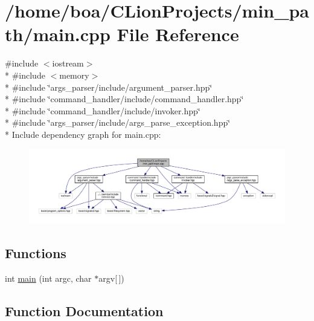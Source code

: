 \hypertarget{a00029}{}\section{/home/boa/\+C\+Lion\+Projects/min\+\_\+path/main.cpp File Reference}
\label{a00029}
{\ttfamily \#include $<$iostream$>$}\\*
{\ttfamily \#include $<$memory$>$}\\*
{\ttfamily \#include \char`\"{}args\+\_\+parser/include/argument\+\_\+parser.\+hpp\char`\"{}}\\*
{\ttfamily \#include \char`\"{}command\+\_\+handler/include/command\+\_\+handler.\+hpp\char`\"{}}\\*
{\ttfamily \#include \char`\"{}command\+\_\+handler/include/invoker.\+hpp\char`\"{}}\\*
{\ttfamily \#include \char`\"{}args\+\_\+parser/include/args\+\_\+parse\+\_\+exception.\+hpp\char`\"{}}\\*
Include dependency graph for main.\+cpp\+:
\nopagebreak
\begin{figure}[H]
\begin{center}
\leavevmode
\includegraphics[width=350pt]{d9/d73/a00060}
\end{center}
\end{figure}
\subsection*{Functions}
\begin{DoxyCompactItemize}
\item 
int \hyperlink{a00029_a0ddf1224851353fc92bfbff6f499fa97_a0ddf1224851353fc92bfbff6f499fa97}{main} (int argc, char $\ast$argv\mbox{[}$\,$\mbox{]})
\end{DoxyCompactItemize}


\subsection{Function Documentation}
